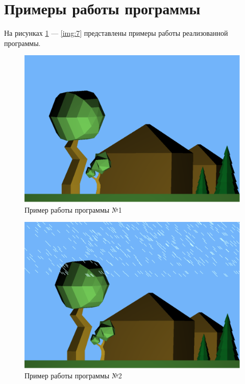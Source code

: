\section{Примеры работы программы}

На рисунках \ref{img:1} — \ref{img:7} представлены примеры работы реализованной
программы.

\begin{figure}[H]
	\centering
	\includegraphics[scale=0.2]{include/1.png}
	\caption{Пример работы программы №1}
	\label{img:1}
\end{figure} 
\begin{figure}[H]
	\centering
	\includegraphics[scale=0.2]{include/2.png}
	\caption{Пример работы программы №2}
	\label{img:2}
\end{figure} 

